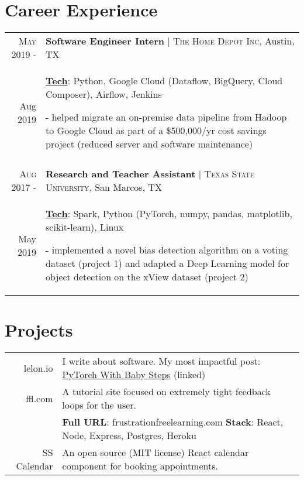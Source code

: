 \documentclass[a4paper,10pt]{article}
\begin{document}
\section{Career Experience}
\begin{tabular}{r|p{12cm}}

\textsc{May 2019 -} & \textbf{Software Engineer Intern} | \textsc{The Home Depot Inc}, Austin, TX \\
Aug 2019 & \small{
	\textbf{\underline{Tech}}: Python, Google Cloud (Dataflow, BigQuery, Cloud Composer), Airflow, Jenkins}

	\tiny{
	\vphantom{a}
	}
	
	\small{
	- helped migrate an on-premise data pipeline from Hadoop to Google Cloud as part of a \$500,000/yr cost savings project (reduced server and software maintenance) } \\
 \multicolumn{2}{c}{} \\

\textsc{Aug 2017 -} & \textbf{Research and Teacher Assistant} | \textsc{Texas State University}, San Marcos, TX \\
May 2019 & \small{
	\textbf{\underline{Tech}}: Spark, Python (PyTorch, numpy, pandas, matplotlib, scikit-learn), Linux
	}

	\tiny{
	\vphantom{a}
	}

	\small{
	
	- implemented a novel bias detection algorithm on a voting dataset (project 1) and adapted a Deep Learning model for object detection on the xView dataset (project 2)	} \\
\end{tabular}

\section{Projects}
\begin{tabular}{rl}	
	
	lelon.io & I write about software. My most impactful post: \href {https://lelon.io/blog/2018/02/08/pytorch-with-baby-steps}{PyTorch With Baby Steps} (linked)  \\
	
	ffl.com & A tutorial site focused on extremely tight feedback loops for the user. \\
	
	 & \textbf{Full URL}: frustrationfreelearning.com \quad \textbf{Stack}: React, Node, Express, Postgres, Heroku\\
	
	SS Calendar & An open source (MIT license) React calendar component for booking appointments. \\
\end{tabular}
\end{document}
